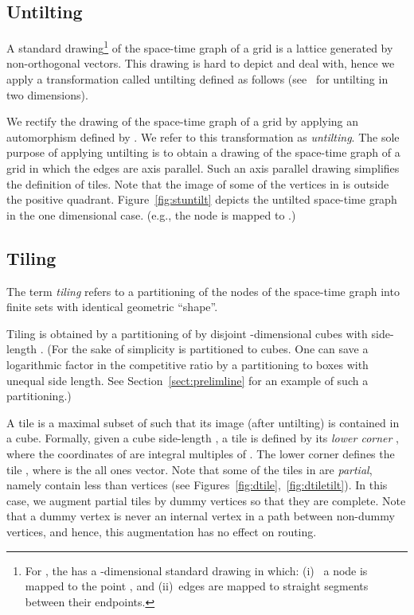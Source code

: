 \documentclass[11pt]{article}
\newenvironment{proof sketch}[1]{\noindent {\emph{Proof sketch of #1:}}}{\hfill \qed}
\begin{document}
\subsection{Untilting}
A standard drawing\footnote{For , the  has a
    -dimensional standard drawing in which: (i)~ a node  is mapped to the point , and (ii)~edges are mapped
    to straight segments between their endpoints.}  of the space-time graph of a grid is a lattice generated by non-orthogonal vectors. This drawing is hard to depict and deal with, hence we apply a transformation called untilting defined as follows (see~\cite{RR} for untilting in two dimensions).


We rectify the drawing of the space-time graph of a grid by applying
an automorphism  defined by
. We refer to this
transformation as \emph{untilting}. The sole purpose of applying
untilting is to obtain a drawing of the space-time graph of a grid in which the edges are axis parallel. Such an axis parallel drawing
simplifies the definition of tiles.
Note that the image of some of the vertices in  is outside the positive quadrant.
Figure~\ref{fig:stuntilt} depicts the untilted space-time graph in the one dimensional case. (e.g., the node  is mapped to .)


\subsection{Tiling}\label{sect:tiling}
The term \emph{tiling} refers to a partitioning of the nodes of the
space-time graph  into finite sets with identical geometric
``shape''.

Tiling is obtained by a partitioning of  by disjoint
-dimensional cubes with side-length .  (For the sake of simplicity
 is partitioned to cubes. One can save a logarithmic factor in the
competitive ratio by a partitioning to boxes with unequal side
length. See Section~\ref{sect:prelimline} for an example of such a partitioning.)


A tile  is a maximal subset of  such that its image  (after untilting) is contained in a cube.
Formally, given a cube side-length , a tile is defined by its \emph{lower corner}
, where the coordinates of  are integral multiples of .
The lower corner  defines the tile , where  is the all ones vector. Note that some of the
tiles in  are \emph{partial}, namely contain less than  vertices (see
Figures~\ref{fig:dtile},~\ref{fig:dtiletilt}). In this case, we augment partial tiles
by dummy vertices so that they are complete.
Note that a dummy vertex is never an internal vertex in a path between non-dummy
vertices, and hence, this augmentation has no effect on routing.
\end{document}
